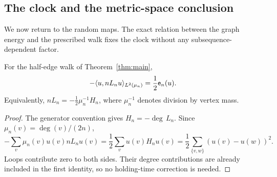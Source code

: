 \subsection{The clock and the metric-space conclusion}

We now return to the random maps.  The exact relation between the
graph energy and the prescribed walk fixes the clock without any
subsequence-dependent factor.

\begin{lemma}\label{dyn:energy-clock}
For the half-edge walk of Theorem~\ref{thm:main},
\[
 -\langle u,nL_nu\rangle_{L^2(\mu_n)}=\frac12\mathsf e_n(u).
\]
Equivalently, $nL_n=-\tfrac12\mu_n^{-1}H_n$, where
$\mu_n^{-1}$ denotes division by vertex mass.
\end{lemma}

\begin{proof}
The generator convention gives $H_n=-\deg\,L_n$.  Since
$\mu_n(v)=\deg(v)/(2n)$,
\[
 -\sum_v\mu_n(v)u(v)nL_nu(v)
   =\frac12\sum_vu(v)H_nu(v)
   =\frac12\sum_{\{v,w\}}(u(v)-u(w))^2.
\]
Loops contribute zero to both sides.  Their degree contributions
are already included in the first identity, so no holding-time
correction is needed.
\end{proof}


